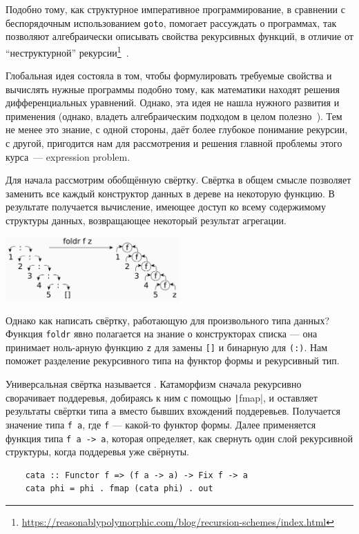 Подобно тому, как структурное императивное программирование, в сравнении с беспорядочным использованием \texttt{goto}, помогает рассуждать о программах, так  позволяют алгебраически описывать свойства рекурсивных функций, в отличие от ``неструктурной'' рекурсии\footnote{\url{https://reasonablypolymorphic.com/blog/recursion-schemes/index.html}}~\cite{meijer1991functional, meijer1995bananas}.

Глобальная идея состояла в том, чтобы формулировать требуемые свойства и вычислять нужные программы подобно тому, как математики находят решения дифференциальных уравнений.
Однако, эта идея не нашла нужного развития и применения (однако, владеть алгебраическим подходом в целом полезно~\cite{maguire-algebra}).
Тем не менее это знание, с одной стороны, даёт более глубокое понимание рекурсии, с другой, пригодится нам для рассмотрения и решения главной проблемы этого курса~--- expression problem.

Для начала рассмотрим обобщённую свёртку.
Свёртка в общем смысле позволяет заменить все каждый конструктор данных в дереве на некоторую функцию.
В результате получается вычисление, имеющее доступ ко всему содержимому структуры данных, возвращающее некоторый результат агрегации.
\begin{center}
    \includegraphics[width=0.5\textwidth]{figs/foldr}
\end{center}

Однако как написать свёртку, работающую для произвольного типа данных?
Функция \texttt{foldr} явно полагается на знание о конструкторах списка --- она принимает ноль-арную функцию \texttt{z} для замены \texttt{[]} и бинарную для \texttt{(:)}.
Нам поможет разделение рекурсивного типа на функтор формы и рекурсивный тип.

Универсальная свёртка называется .
Катаморфизм сначала рекурсивно сворачивает поддеревья, добираясь к ним с помощью \texttt|fmap|, и оставляет результаты свёртки типа \texttt{a} вместо бывших вхождений поддеревьев.
Получается значение типа \texttt{f a}, где \texttt{f} --- какой-то функтор формы.
Далее применяется функция типа \texttt{f a -> a}, которая определяет, как свернуть один слой рекурсивной структуры, когда поддеревья уже свёрнуты.
\begin{verbatim}
    cata :: Functor f => (f a -> a) -> Fix f -> a
    cata phi = phi . fmap (cata phi) . out
\end{verbatim}

